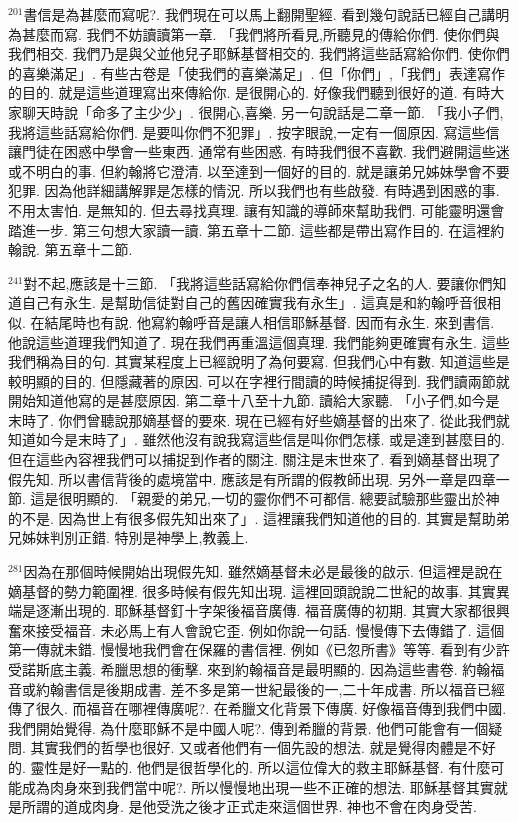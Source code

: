\documentclass{book}
\begin{document}
$^{201}$書信是為甚麼而寫呢?.
我們現在可以馬上翻開聖經.
看到幾句說話已經自己講明為甚麼而寫.
我們不妨讀讀第一章.
「我們將所看見,所聽見的傳給你們.
使你們與我們相交.
我們乃是與父並他兒子耶穌基督相交的.
我們將這些話寫給你們.
使你們的喜樂滿足」.
有些古卷是「使我們的喜樂滿足」.
但「你們」,「我們」表達寫作的目的.
就是這些道理寫出來傳給你.
是很開心的.
好像我們聽到很好的道.
有時大家聊天時說「命多了主少少」.
很開心,喜樂.
另一句說話是二章一節.
「我小子們,我將這些話寫給你們.
是要叫你們不犯罪」.
按字眼說,一定有一個原因.
寫這些信讓門徒在困惑中學會一些東西.
通常有些困惑.
有時我們很不喜歡.
我們避開這些迷或不明白的事.
但約翰將它澄清.
以至達到一個好的目的.
就是讓弟兄姊妹學會不要犯罪.
因為他詳細講解罪是怎樣的情況.
所以我們也有些啟發.
有時遇到困惑的事.
不用太害怕.
是無知的.
但去尋找真理.
讓有知識的導師來幫助我們.
可能靈明還會踏進一步.
第三句想大家讀一讀.
第五章十二節.
這些都是帶出寫作目的.
在這裡約翰說.
第五章十二節.

$^{241}$對不起,應該是十三節.
「我將這些話寫給你們信奉神兒子之名的人.
要讓你們知道自己有永生.
是幫助信徒對自己的舊因確實我有永生」.
這真是和約翰呼音很相似.
在結尾時也有說.
他寫約翰呼音是讓人相信耶穌基督.
因而有永生.
來到書信.
他說這些道理我們知道了.
現在我們再重溫這個真理.
我們能夠更確實有永生.
這些我們稱為目的句.
其實某程度上已經說明了為何要寫.
但我們心中有數.
知道這些是較明顯的目的.
但隱藏著的原因.
可以在字裡行間讀的時候捕捉得到.
我們讀兩節就開始知道他寫的是甚麼原因.
第二章十八至十九節.
讀給大家聽.
「小子們,如今是末時了.
你們曾聽說那嫡基督的要來.
現在已經有好些嫡基督的出來了.
從此我們就知道如今是末時了」.
雖然他沒有說我寫這些信是叫你們怎樣.
或是達到甚麼目的.
但在這些內容裡我們可以捕捉到作者的關注.
關注是末世來了.
看到嫡基督出現了假先知.
所以書信背後的處境當中.
應該是有所謂的假教師出現.
另外一章是四章一節.
這是很明顯的.
「親愛的弟兄,一切的靈你們不可都信.
總要試驗那些靈出於神的不是.
因為世上有很多假先知出來了」.
這裡讓我們知道他的目的.
其實是幫助弟兄姊妹判別正錯.
特別是神學上,教義上.

$^{281}$因為在那個時候開始出現假先知.
雖然嫡基督未必是最後的啟示.
但這裡是說在嫡基督的勢力範圍裡.
很多時候有假先知出現.
這裡回頭說說二世紀的故事.
其實異端是逐漸出現的.
耶穌基督釘十字架後福音廣傳.
福音廣傳的初期.
其實大家都很興奮來接受福音.
未必馬上有人會說它歪.
例如你說一句話.
慢慢傳下去傳錯了.
這個第一傳就未錯.
慢慢地我們會在保羅的書信裡.
例如《已忽所書》等等.
看到有少許受諾斯底主義.
希臘思想的衝擊.
來到約翰福音是最明顯的.
因為這些書卷.
約翰福音或約翰書信是後期成書.
差不多是第一世紀最後的一,二十年成書.
所以福音已經傳了很久.
而福音在哪裡傳廣呢?.
在希臘文化背景下傳廣.
好像福音傳到我們中國.
我們開始覺得.
為什麼耶穌不是中國人呢?.
傳到希臘的背景.
他們可能會有一個疑問.
其實我們的哲學也很好.
又或者他們有一個先設的想法.
就是覺得肉體是不好的.
靈性是好一點的.
他們是很哲學化的.
所以這位偉大的救主耶穌基督.
有什麼可能成為肉身來到我們當中呢?.
所以慢慢地出現一些不正確的想法.
耶穌基督其實就是所謂的道成肉身.
是他受洗之後才正式走來這個世界.
神也不會在肉身受苦.
\end{document}
